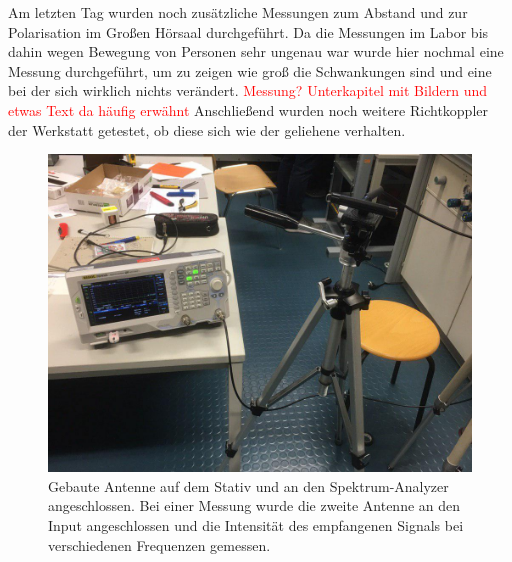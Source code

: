 \documentclass[titlepage,11pt,a4paper,ngerman]{article}
\begin{document}
Am letzten Tag wurden noch zusätzliche Messungen zum Abstand und zur Polarisation im Großen Hörsaal durchgeführt. Da die Messungen im Labor bis dahin wegen Bewegung von Personen sehr ungenau war wurde hier nochmal eine Messung durchgeführt, um zu zeigen wie groß die Schwankungen sind und eine bei der sich wirklich nichts verändert. \textcolor{red}{Messung? Unterkapitel mit Bildern und etwas Text da häufig erwähnt}
Anschließend wurden noch weitere Richtkoppler der Werkstatt getestet, ob diese sich wie der geliehene verhalten.
\begin{figure}[ht]
	\centering
	\includegraphics[scale=0.35, trim={0cm 8cm 3cm 2cm}, clip]{Bilder/Ant_Fktgen}
	\caption{Gebaute Antenne auf dem Stativ und an den Spektrum-Analyzer angeschlossen. Bei einer Messung wurde die zweite Antenne an den Input angeschlossen und die Intensität des empfangenen Signals bei verschiedenen Frequenzen gemessen.}
	\label{ersteMessung}
\end{figure}
\end{document}
